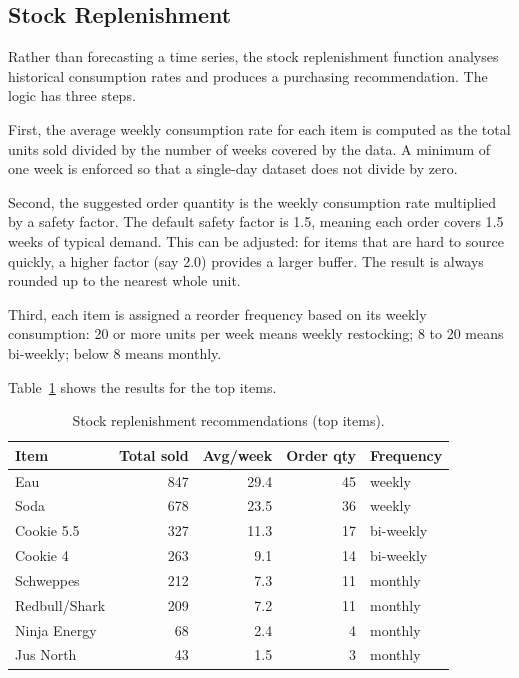 \documentclass[12pt, a4paper]{report}
\begin{document}
\subsection{Stock Replenishment}

Rather than forecasting a time series, the stock replenishment function analyses
historical consumption rates and produces a purchasing recommendation. The logic
has three steps.

First, the average weekly consumption rate for each item is computed as the total
units sold divided by the number of weeks covered by the data. A minimum of one
week is enforced so that a single-day dataset does not divide by zero.

Second, the suggested order quantity is the weekly consumption rate multiplied by
a safety factor. The default safety factor is 1.5, meaning each order covers 1.5
weeks of typical demand. This can be adjusted: for items that are hard to source
quickly, a higher factor (say 2.0) provides a larger buffer. The result is always
rounded up to the nearest whole unit.

Third, each item is assigned a reorder frequency based on its weekly consumption:
20 or more units per week means weekly restocking; 8 to 20 means bi-weekly; below
8 means monthly.

Table~\ref{tab:stock_top} shows the results for the top items.

\begin{table}[H]
  \centering
  \caption{Stock replenishment recommendations (top items).\label{tab:stock_top}}
  \begin{tabular}{lrrrl}
    \toprule
    \textbf{Item} & \textbf{Total sold} & \textbf{Avg/week} &
    \textbf{Order qty} & \textbf{Frequency} \\
    \midrule
    Eau           & 847 & 29.4 & 45 & weekly \\
    Soda          & 678 & 23.5 & 36 & weekly \\
    Cookie 5.5    & 327 & 11.3 & 17 & bi-weekly \\
    Cookie 4      & 263 &  9.1 & 14 & bi-weekly \\
    Schweppes     & 212 &  7.3 & 11 & monthly \\
    Redbull/Shark & 209 &  7.2 & 11 & monthly \\
    Ninja Energy  &  68 &  2.4 &  4 & monthly \\
    Jus North     &  43 &  1.5 &  3 & monthly \\
    \bottomrule
  \end{tabular}
\end{table}
\end{document}
